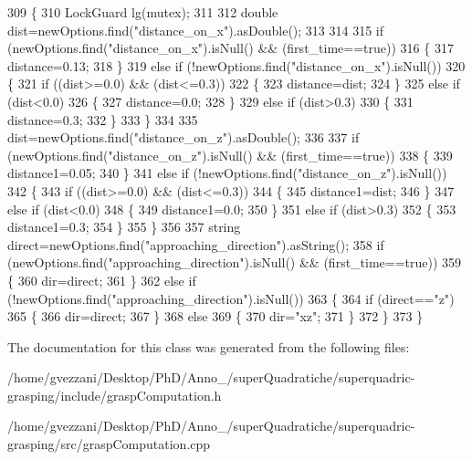 \begin{DoxyCode}
309 \{
310     LockGuard lg(mutex);
311 
312     \textcolor{keywordtype}{double} dist=newOptions.find(\textcolor{stringliteral}{"distance\_on\_x"}).asDouble();
313 
314 
315     \textcolor{keywordflow}{if} (newOptions.find(\textcolor{stringliteral}{"distance\_on\_x"}).isNull() && (first\_time==\textcolor{keyword}{true}))
316     \{
317         distance=0.13;
318     \}
319     \textcolor{keywordflow}{else} \textcolor{keywordflow}{if} (!newOptions.find(\textcolor{stringliteral}{"distance\_on\_x"}).isNull())
320     \{
321         \textcolor{keywordflow}{if} ((dist>=0.0) && (dist<=0.3))
322         \{
323             distance=dist;
324         \}
325         \textcolor{keywordflow}{else} \textcolor{keywordflow}{if} (dist<0.0)
326         \{
327             distance=0.0;
328         \}
329         \textcolor{keywordflow}{else} \textcolor{keywordflow}{if} (dist>0.3)
330         \{
331             distance=0.3;
332         \}
333     \}
334 
335     dist=newOptions.find(\textcolor{stringliteral}{"distance\_on\_z"}).asDouble();
336 
337     \textcolor{keywordflow}{if} (newOptions.find(\textcolor{stringliteral}{"distance\_on\_z"}).isNull() && (first\_time==\textcolor{keyword}{true}))
338     \{
339         distance1=0.05;
340     \}
341     \textcolor{keywordflow}{else} \textcolor{keywordflow}{if} (!newOptions.find(\textcolor{stringliteral}{"distance\_on\_z"}).isNull())
342     \{
343         \textcolor{keywordflow}{if} ((dist>=0.0) && (dist<=0.3))
344         \{
345             distance1=dist;
346         \}
347         \textcolor{keywordflow}{else} \textcolor{keywordflow}{if} (dist<0.0)
348         \{
349             distance1=0.0;
350         \}
351         \textcolor{keywordflow}{else} \textcolor{keywordflow}{if} (dist>0.3)
352         \{
353             distance1=0.3;
354         \}
355     \}
356 
357     \textcolor{keywordtype}{string} direct=newOptions.find(\textcolor{stringliteral}{"approaching\_direction"}).asString();
358     \textcolor{keywordflow}{if} (newOptions.find(\textcolor{stringliteral}{"approaching\_direction"}).isNull() && (first\_time==\textcolor{keyword}{true}))
359     \{
360         dir=direct;
361     \}
362     \textcolor{keywordflow}{else} \textcolor{keywordflow}{if} (!newOptions.find(\textcolor{stringliteral}{"approaching\_direction"}).isNull())
363     \{
364         \textcolor{keywordflow}{if} (direct==\textcolor{stringliteral}{"z"})
365         \{
366             dir=direct;
367         \}
368         \textcolor{keywordflow}{else}
369         \{
370             dir=\textcolor{stringliteral}{"xz"};
371         \}
372     \}
373 \}
\end{DoxyCode}


The documentation for this class was generated from the following files\+:\begin{DoxyCompactItemize}
\item 
/home/gvezzani/\+Desktop/\+Ph\+D/\+Anno\+\_/super\+Quadratiche/superquadric-\/grasping/include/grasp\+Computation.\+h\item 
/home/gvezzani/\+Desktop/\+Ph\+D/\+Anno\+\_/super\+Quadratiche/superquadric-\/grasping/src/grasp\+Computation.\+cpp\end{DoxyCompactItemize}
